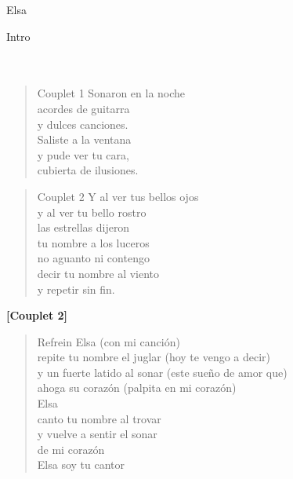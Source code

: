 \begin{song}[tango]{Elsa}
\begin{instrumental}{Intro}
 \measure{}  \measure*{}\\
 \measure{}  \measure*{}\\
 \measure{}  \measure*{}\\
 \measure{} 
\end{instrumental}

\begin{verse}{Couplet 1}
\chord{}Sonaron en la noche \\
acordes de guitarra \\
y dulces canciones.\\
Saliste a la ventana \\
y pude ver tu cara, \\
cubierta de ilusiones.
\end{verse}

\begin{verse}{Couplet 2}
Y al ver tus bellos ojos\\
y al ver tu bello rostro\\
las estrellas dijeron \\
tu nombre a los luceros\\
no aguanto ni contengo\\
decir tu nombre al viento\\
y repetir sin fin.
\end{verse}

\textbf{[Couplet 2]}

\begin{verse}{Refrein}
Elsa   (con mi canción)\\
repite tu nombre el juglar  (hoy te vengo a decir)\\
y un fuerte latido al sonar  (este sueño de amor que)\\
ahoga su corazón   (palpita en mi corazón)\\
  
Elsa\\
canto tu nombre al trovar\\
y vuelve a sentir el sonar\\
de mi corazón\\

Elsa soy tu cantor
\end{verse}


\begin{translation}

\end{translation}
\end{song}
